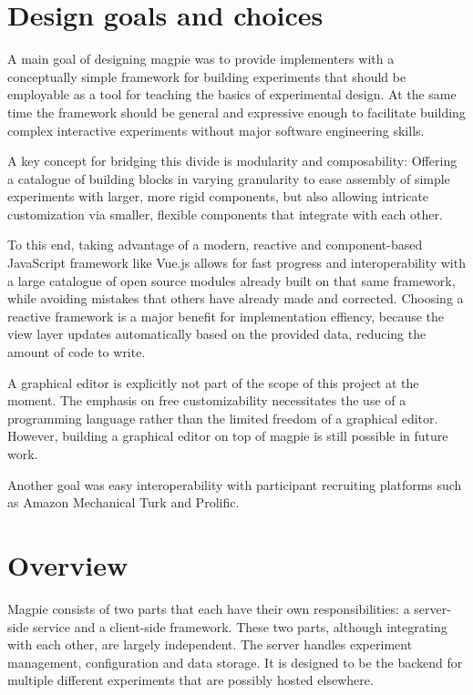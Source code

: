 \documentclass[a4paper,11pt]{scrreprt}
\begin{document}
\section{Design goals and choices}
A main goal of designing magpie was to provide implementers with a conceptually simple framework for building experiments that should be employable as a tool for teaching the basics of experimental design. At the same time the framework should be general and expressive enough to facilitate building complex interactive experiments without major software engineering skills.

A key concept for bridging this divide is modularity and composability: Offering a catalogue of building blocks in varying granularity to ease assembly of simple experiments with larger, more rigid components, but also allowing intricate customization via smaller, flexible components that integrate with each other.

To this end, taking advantage of a modern, reactive and component-based JavaScript framework like Vue.js \citep{You2014} allows for fast progress and interoperability with a large catalogue of open source modules already built on that same framework, while avoiding mistakes that others have already made and corrected. Choosing a reactive framework is a major benefit for implementation effiency, because the view layer updates automatically based on the provided data, reducing the amount of code to write.

A graphical editor is explicitly not part of the scope of this project at the moment. The emphasis on free customizability necessitates the use of a programming language rather than the limited freedom of a graphical editor. However, building a graphical editor on top of magpie is still possible in future work.

Another goal was easy interoperability with participant recruiting platforms such as Amazon Mechanical Turk and Prolific.

\section{Overview}
Magpie consists of two parts that each have their own responsibilities: a server-side service and a client-side framework. These two parts, although integrating with each other, are largely independent. The server handles experiment management, configuration and data storage. It is designed to be the backend for multiple different experiments that are possibly hosted elsewhere.
\end{document}
